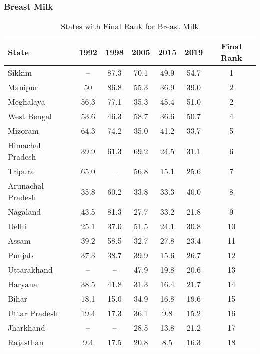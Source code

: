 \subsubsection{Breast Milk}
\begin{table}[h!]
\centering
\begin{tabular}{lcccccc}
\toprule
\textbf{State} & \textbf{1992} & \textbf{1998} & \textbf{2005} & \textbf{2015} & \textbf{2019} & \textbf{Final Rank} \\
\midrule
Sikkim             & --   & 87.3  & 70.1  & 49.9  & 54.7  & 1  \\
Manipur           & 50   & 86.8  & 55.3  & 36.9  & 39.0  & 2  \\
Meghalaya         & 56.3 & 77.1  & 35.3  & 45.4  & 51.0  & 2  \\
West Bengal       & 53.6 & 46.3  & 58.7  & 36.6  & 50.7  & 4  \\
Mizoram           & 64.3 & 74.2  & 35.0  & 41.2  & 33.7  & 5  \\
Himachal Pradesh  & 39.9 & 61.3  & 69.2  & 24.5  & 31.1  & 6  \\
Tripura           & 65.0 & --    & 56.8  & 15.1  & 25.6  & 7  \\
Arunachal Pradesh & 35.8 & 60.2  & 33.8  & 33.3  & 40.0  & 8  \\
Nagaland          & 43.5 & 81.3  & 27.7  & 33.2  & 21.8  & 9  \\
Delhi             & 25.1 & 37.0  & 51.5  & 24.1  & 30.8  & 10 \\
Assam             & 39.2 & 58.5  & 32.7  & 27.8  & 23.4  & 11 \\
Punjab            & 37.3 & 38.7  & 39.9  & 15.6  & 26.7  & 12 \\
Uttarakhand       & --   & --    & 47.9  & 19.8  & 20.6  & 13 \\
Haryana           & 38.5 & 41.8  & 31.3  & 16.4  & 21.7  & 14 \\
Bihar             & 18.1 & 15.0  & 34.9  & 16.8  & 19.6  & 15 \\
Uttar Pradesh     & 19.4 & 17.3  & 36.1  & 9.8   & 15.2  & 16 \\
Jharkhand         & --   & --    & 28.5  & 13.8  & 21.2  & 17 \\
Rajasthan         & 9.4  & 17.5  & 20.8  & 8.5   & 16.3  & 18 \\
\bottomrule
\end{tabular}
\caption{States with Final Rank for Breast Milk}
\label{tab:breastmilk_rank}
\end{table}

